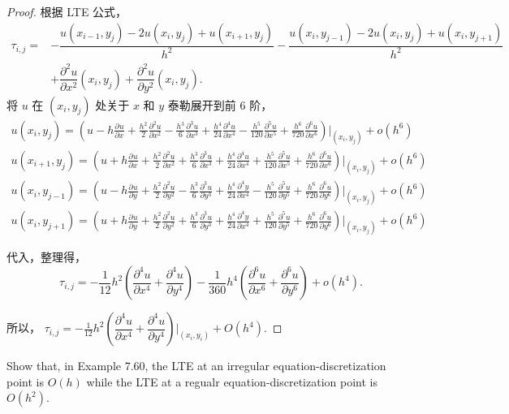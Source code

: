 \documentclass[lang=cn,a4paper,newtx,bibend=bibtex]{elegantpaper}
\newcommand{\apart}[3]{\frac{\partial^{#3}{#1}}{\partial {#2}^{#3}}}
\begin{document}
\begin{proof}
  根据 LTE 公式，
  \begin{equation*}
  \begin{aligned}
  \tau_{i,j} = &- \dfrac{u(x_{i-1}, y_j) - 2u(x_i, y_j) + u(x_{i+1}, y_j)}{h^2} 
  -\dfrac{u(x_i, y_{j-1}) - 2u(x_i, y_j) + u(x_i, y_{j+1})}{h^2} \\
  &+ \dfrac{\partial^2 u}{\partial x^2} (x_i, y_j) + \dfrac{\partial^2 u}{\partial y^2} (x_i, y_j).
  \end{aligned}
  \end{equation*}
  将 $u$ 在 $(x_i, y_j)$ 处关于 $x$ 和 $y$ 泰勒展开到前 6 阶，
  \begin{equation*}
  \begin{aligned}
  u(x_i, y_j)     = \left(u - h\apart{u}{x}{} + \frac{h^2}{2} \apart{u}{x}{2} - \frac{h^3}6\apart{u}{x}{3} + \frac{h^4}{24}\apart{u}{x}{4} - \frac{h^5}{120} \apart{u}{x}{5} + \frac{h^6}{720} \apart{u}{x}{6} \right)\bigg|_{(x_i, y_j)} + o(h^6) \\
  u(x_{i+1}, y_j) = \left(u + h\apart{u}{x}{} + \frac{h^2}{2} \apart{u}{x}{2} + \frac{h^3}6\apart{u}{x}{3} + \frac{h^4}{24}\apart{u}{x}{4} + \frac{h^5}{120} \apart{u}{x}{5} + \frac{h^6}{720} \apart{u}{x}{6} \right)\bigg|_{(x_i, y_j)} + o(h^6) \\
  u(x_i, y_{j-1}) = \left(u - h\apart{u}{y}{} + \frac{h^2}{2} \apart{u}{y}{2} - \frac{h^3}6\apart{u}{y}{3} + \frac{h^4}{24}\apart{y}{x}{4} - \frac{h^5}{120} \apart{u}{y}{5} + \frac{h^6}{720} \apart{u}{y}{6} \right)\bigg|_{(x_i, y_j)} + o(h^6) \\
  u(x_i, y_{j+1}) = \left(u + h\apart{u}{y}{} + \frac{h^2}{2} \apart{u}{y}{2} + \frac{h^3}6\apart{u}{y}{3} + \frac{h^4}{24}\apart{y}{x}{4} + \frac{h^5}{120} \apart{u}{y}{5} + \frac{h^6}{720} \apart{u}{y}{6} \right)\bigg|_{(x_i, y_j)} + o(h^6)
  \end{aligned}
  \end{equation*} 
  
  代入，整理得，
  \[\tau_{i,j} = -\dfrac1{12} h^2 \left(\apart{u}{x}{4} + \apart{u}{y}{4}\right) - \dfrac1{360}h^4\left(\apart{u}{x}{6} + \apart{u}{y}{6}\right) + o(h^4).\]
  
  所以，
  $\tau_{i, j} = -\frac{1}{12} h^2 \left(\dfrac{\partial^4 u}{\partial x^4} + 
    \dfrac{\partial^4 u}{\partial y^4}\right)\bigg|_{(x_i, y_i)} + O(h^4).$
  \end{proof}

\begin{prob}[Exercise 7.61]
  Show that, in Example 7.60, the LTE at an irregular equation-discretization point
  is $O(h)$ while the LTE at a regualr equation-discretization point is $O(h^2)$.
\end{prob}
\end{document}
